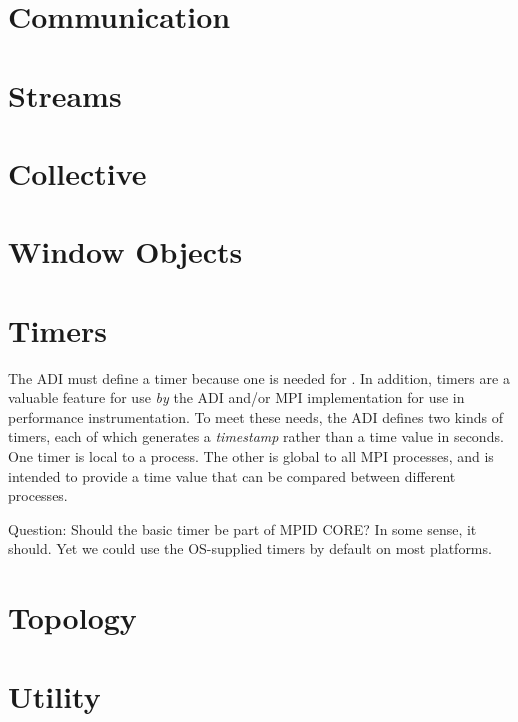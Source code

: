 \documentclass{article}
\begin{document}
\section{Communication}



\section{Streams}



\section{Collective}
%


\section{Window Objects}
\label{sec:window-objects}


\section{Timers}
\label{sec:timers}
The ADI must define a timer because one is needed for .  In
addition, timers are a valuable feature for use \emph{by} the ADI and/or MPI
implementation for use in performance instrumentation.  To meet these needs,
the ADI defines two kinds of timers, each of which generates a
\emph{timestamp} rather than a time value in seconds.  
One timer is local to a process. The other is global to all MPI processes, and
is intended to provide a time value that can be compared between different
processes.  

Question: Should the basic timer be part of MPID CORE?  In some sense, it
should.  Yet we could use the OS-supplied timers by default on most platforms.



\section{Topology}



\section{Utility}

 
\end{document}
